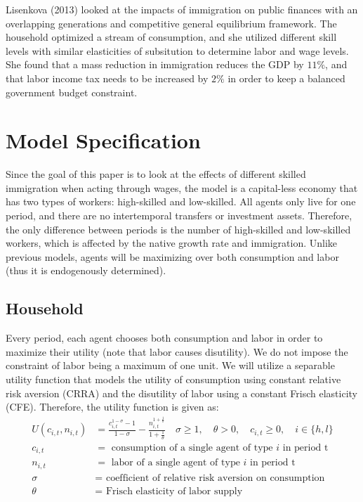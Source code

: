\documentclass[11pt]{article}
\begin{document}
Lisenkova (2013) \cite{lisenkova} looked at the impacts of immigration on public finances with an overlapping generations and competitive general equilibrium framework. The household optimized a stream of consumption, and she utilized different skill levels with similar elasticities of subsitution to determine labor and wage levels. She found that a mass reduction in immigration reduces the GDP by $11\%$, and that labor income tax needs to be increased by $2\%$ in order to keep a balanced government budget constraint.

\section{Model Specification}
Since the goal of this paper is to look at the effects of different skilled immigration when acting through wages, the model is a capital-less economy that has two types of workers: high-skilled and low-skilled. All agents only live for one period, and there are no intertemporal transfers or investment assets. Therefore, the only difference between periods is the number of high-skilled and low-skilled workers, which is affected by the native growth rate and immigration. Unlike previous models, agents will be maximizing over both consumption and labor (thus it is endogenously determined).

  \subsection{Household}

  Every period, each agent chooses both consumption and labor in order to maximize their utility (note that labor causes disutility). We do not impose the constraint of labor being a maximum of one unit. We will utilize a separable utility function that models the utility of consumption using constant relative risk aversion (CRRA) and the disutility of labor using a constant Frisch elasticity (CFE). Therefore, the utility function is given as:
  \begin{align*}
    U(c_{i,t}, n_{i,t}) &= \frac{c_{i,t}^{1-\sigma}-1}{1-\sigma}-\frac{n_{i,t}^{1+\frac{1}{\theta}}}{1+\frac{1}{\theta}} \quad \sigma \geq 1, \quad \theta>0, \quad c_{i,t}\geq 0,\quad i\in\{h, l\} \\
    c_{i,t} &= \text{ consumption of a single agent of type $i$ in period t} \\
    n_{i,t} &= \text{ labor of a single agent of type $i$ in period t} \\
    \sigma &= \text{ coefficient of relative risk aversion on consumption}\\
    \theta &= \text{ Frisch elasticity of labor supply}
  \end{align*}
\end{document}
